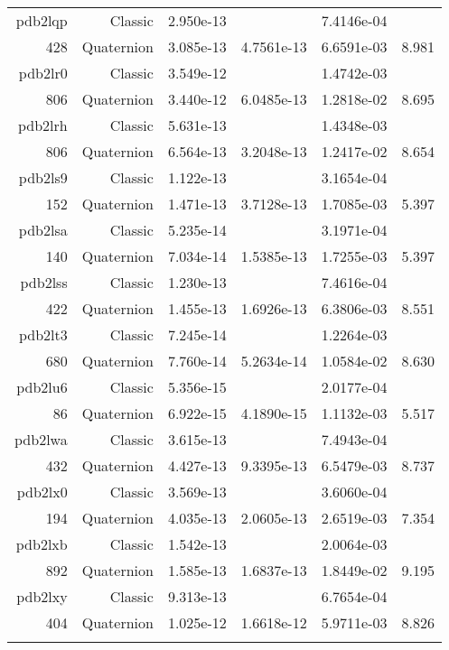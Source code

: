 \begin{xltabular}{\textwidth}{r|rS[table-format=1.3e+2]S[table-format=1.4e+2]S[table-format=1.4e+2]S[table-format=-1.3]}
pdb2lqp & Classic & 2.950e-13 &  & 7.4146e-04 & \\
428 & Quaternion & 3.085e-13 & 4.7561e-13 & 6.6591e-03 & 8.981\\  \addlinespace
pdb2lr0 & Classic & 3.549e-12 &  & 1.4742e-03 & \\
806 & Quaternion & 3.440e-12 & 6.0485e-13 & 1.2818e-02 & 8.695\\  \addlinespace
pdb2lrh & Classic & 5.631e-13 &  & 1.4348e-03 & \\
806 & Quaternion & 6.564e-13 & 3.2048e-13 & 1.2417e-02 & 8.654\\  \addlinespace
pdb2ls9 & Classic & 1.122e-13 &  & 3.1654e-04 & \\
152 & Quaternion & 1.471e-13 & 3.7128e-13 & 1.7085e-03 & 5.397\\  \addlinespace
pdb2lsa & Classic & 5.235e-14 &  & 3.1971e-04 & \\
140 & Quaternion & 7.034e-14 & 1.5385e-13 & 1.7255e-03 & 5.397\\  \addlinespace
pdb2lss & Classic & 1.230e-13 &  & 7.4616e-04 & \\
422 & Quaternion & 1.455e-13 & 1.6926e-13 & 6.3806e-03 & 8.551\\  \addlinespace
pdb2lt3 & Classic & 7.245e-14 &  & 1.2264e-03 & \\
680 & Quaternion & 7.760e-14 & 5.2634e-14 & 1.0584e-02 & 8.630\\  \addlinespace
pdb2lu6 & Classic & 5.356e-15 &  & 2.0177e-04 & \\
86 & Quaternion & 6.922e-15 & 4.1890e-15 & 1.1132e-03 & 5.517\\  \addlinespace
pdb2lwa & Classic & 3.615e-13 &  & 7.4943e-04 & \\
432 & Quaternion & 4.427e-13 & 9.3395e-13 & 6.5479e-03 & 8.737\\  \addlinespace
pdb2lx0 & Classic & 3.569e-13 &  & 3.6060e-04 & \\
194 & Quaternion & 4.035e-13 & 2.0605e-13 & 2.6519e-03 & 7.354\\  \addlinespace
pdb2lxb & Classic & 1.542e-13 &  & 2.0064e-03 & \\
892 & Quaternion & 1.585e-13 & 1.6837e-13 & 1.8449e-02 & 9.195\\  \addlinespace
pdb2lxy & Classic & 9.313e-13 &  & 6.7654e-04 & \\
404 & Quaternion & 1.025e-12 & 1.6618e-12 & 5.9711e-03 & 8.826\\  \addlinespace

\end{xltabular}
